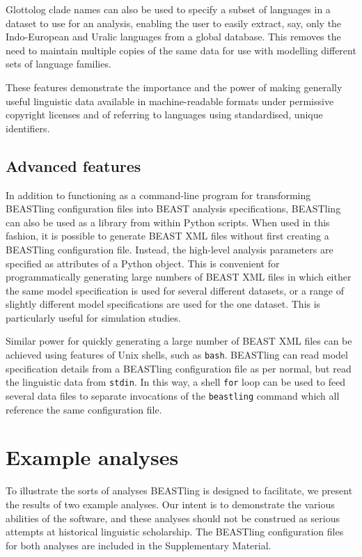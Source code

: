 \documentclass[twocolumn,10pt]{scrartcl}
\begin{document}
Glottolog clade names can also be used to specify a subset of languages in a dataset to use for an analysis, enabling the user to easily extract, say, only the Indo-European and Uralic languages from a global database.  This removes the need to maintain multiple copies of the same data for use with modelling different sets of language families.

These features demonstrate the importance and the power of making generally useful linguistic data available in machine-readable formats under permissive copyright licenses and of referring to languages using standardised, unique identifiers.

\subsection{Advanced features}

In addition to functioning as a command-line program for transforming BEASTling configuration files into BEAST analysis specifications, BEASTling can also be used as a library from within Python scripts.  When used in this fashion, it is possible to generate BEAST XML files without first creating a BEASTling configuration file.  Instead, the high-level analysis parameters are specified as attributes of a Python object.  This is convenient for programmatically generating large numbers of BEAST XML files in which either the same model specification is used for several different datasets, or a range of slightly different model specifications are used for the one dataset.  This is particularly useful for simulation studies.

Similar power for quickly generating a large number of BEAST XML files can be achieved using features of Unix shells, such as \texttt{bash}.  BEASTling can read model specification details from a BEASTling configuration file as per normal, but read the linguistic data from \texttt{stdin}.  In this way, a shell \texttt{for} loop can be used to feed several data files to separate invocations of the \texttt{beastling} command which all reference the same configuration file.

\section{Example analyses}

To illustrate the sorts of analyses BEASTling is designed to facilitate, we present the results of two example analyses.  Our intent is to demonstrate the various abilities of the software, and these analyses should not be construed as serious attempts at historical linguistic scholarship.  The BEASTling configuration files for both analyses are included in the Supplementary Material.
\end{document}
